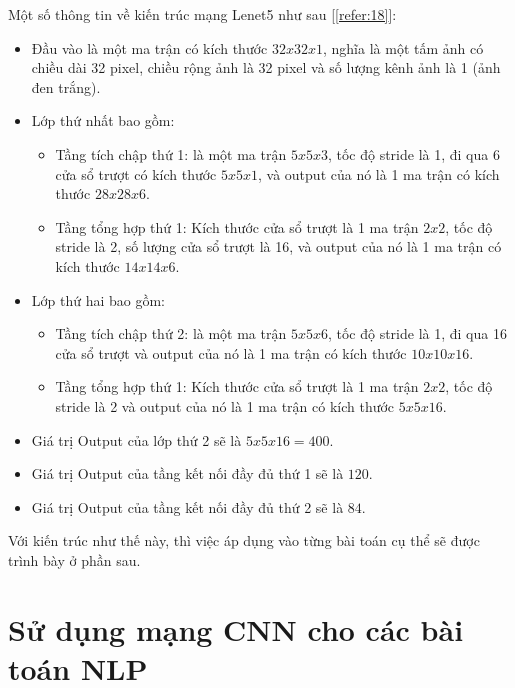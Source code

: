 Một số thông tin về kiến trúc mạng Lenet5 như sau [\ref{refer:18}]:
\begin{itemize}
  \item Đầu vào là một ma trận có kích thước $32x32x1$, nghĩa là một tấm ảnh có chiều dài 32 pixel, chiều rộng ảnh là 32 pixel và số lượng kênh ảnh là 1 (ảnh đen trắng).
  \item Lớp thứ nhất bao gồm:
  \begin{itemize}
    \item Tầng tích chập thứ 1: là một ma trận $5x5x3$, tốc độ stride là 1, đi qua 6 cửa sổ trượt có kích thước $5x5x1$, và output của nó là 1 ma trận có kích thước $28x28x6$.
    \item Tầng tổng hợp thứ 1: Kích thước cửa sổ trượt là 1 ma trận $2x2$, tốc độ stride là 2, số lượng cửa sổ trượt là 16, và output của nó là 1 ma trận có kích thước $14x14x6$.
  \end{itemize}
  \item Lớp thứ hai bao gồm:
  \begin{itemize}
    \item Tầng tích chập thứ 2: là một ma trận $5x5x6$, tốc độ stride là 1, đi qua 16 cửa sổ trượt và output của nó là 1 ma trận có kích thước $10x10x16$.
    \item Tầng tổng hợp thứ 1: Kích thước cửa sổ trượt là 1 ma trận $2x2$, tốc độ stride là 2 và output của nó là 1 ma trận có kích thước $5x5x16$.
  \end{itemize}
  \item Giá trị Output của lớp thứ 2 sẽ là $5x5x16 = 400$.
  \item Giá trị Output của tầng kết nối đầy đủ thứ 1 sẽ là $120$.
  \item Giá trị Output của tầng kết nối đầy đủ thứ 2 sẽ là $84$.
\end{itemize}

Với kiến trúc như thế này, thì việc áp dụng vào từng bài toán cụ thể sẽ được trình bày ở phần sau.

\section{Sử dụng mạng CNN cho các bài toán NLP}
\label{sec6:introduction}
